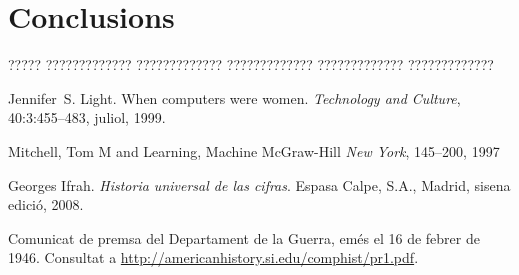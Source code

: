 \documentclass[11pt,spanish,listoffigures,listoftables]{tfgetsinf}
\begin{document}
\chapter{Conclusions}

????? ????????????? ????????????? ????????????? ????????????? ????????????? 


\begin{thebibliography}{10}

   Jennifer~S. Light.
   \newblock When computers were women.
   \newblock \textit{Technology and Culture}, 40:3:455--483, juliol, 1999.

	Mitchell, Tom M and Learning, Machine
	\newblock McGraw-Hill
	\newblock \textit{New York}, 145--200, 1997

   Georges Ifrah.
   \newblock \textit{Historia universal de las cifras}.
   \newblock Espasa Calpe, S.A., Madrid, sisena edició, 2008.

   Comunicat de premsa del Departament de la Guerra, 
   emés el 16 de febrer de 1946. 
   \newblock Consultat a 
   \url{http://americanhistory.si.edu/comphist/pr1.pdf}.

\end{thebibliography}
\cleardoublepage

\end{document}
